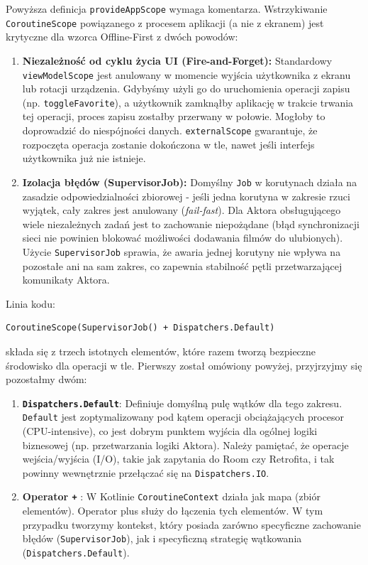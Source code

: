 Powyższa definicja \texttt{provideAppScope} wymaga komentarza. Wstrzykiwanie \texttt{CoroutineScope} powiązanego z procesem aplikacji (a nie z ekranem) jest krytyczne dla wzorca Offline-First z dwóch powodów: 
\begin{enumerate}
    \item \textbf{Niezależność od cyklu życia UI (Fire-and-Forget):}
    Standardowy \texttt{viewModelScope} jest anulowany w momencie wyjścia użytkownika z ekranu lub rotacji urządzenia. Gdybyśmy użyli go do uruchomienia operacji zapisu (np. \texttt{toggleFavorite}), a użytkownik zamknąłby aplikację w trakcie trwania tej operacji, proces zapisu zostałby przerwany w połowie. Mogłoby to doprowadzić do niespójności danych. \texttt{externalScope} gwarantuje, że rozpoczęta operacja zostanie dokończona w tle, nawet jeśli interfejs użytkownika już nie istnieje.

    \item \textbf{Izolacja błędów (SupervisorJob):}
    Domyślny \texttt{Job} w korutynach działa na zasadzie odpowiedzialności zbiorowej - jeśli jedna korutyna w zakresie rzuci wyjątek, cały zakres jest anulowany (\textit{fail-fast}). Dla Aktora obsługującego wiele niezależnych zadań jest to zachowanie niepożądane (błąd synchronizacji sieci nie powinien blokować możliwości dodawania filmów do ulubionych). Użycie \texttt{SupervisorJob} sprawia, że awaria jednej korutyny nie wpływa na pozostałe ani na sam zakres, co zapewnia stabilność pętli przetwarzającej komunikaty Aktora.
\end{enumerate}

Linia kodu:
\begin{verbatim}
CoroutineScope(SupervisorJob() + Dispatchers.Default)
\end{verbatim}
składa się z trzech istotnych elementów, które razem tworzą bezpieczne środowisko dla operacji w tle. Pierwszy został omówiony powyżej, przyjrzyjmy się pozostałmy dwóm:

\begin{enumerate}
    
    \item \textbf{\texttt{Dispatchers.Default}}: 
    Definiuje domyślną pulę wątków dla tego zakresu. \texttt{Default} jest zoptymalizowany pod kątem operacji obciążających procesor (CPU-intensive), co jest dobrym punktem wyjścia dla ogólnej logiki biznesowej (np. przetwarzania logiki Aktora). Należy pamiętać, że operacje wejścia/wyjścia (I/O), takie jak zapytania do Room czy Retrofita, i tak powinny wewnętrznie przełączać się na \texttt{Dispatchers.IO}.
    
    \item \textbf{Operator \texttt{+}} : 
    W Kotlinie \texttt{CoroutineContext} działa jak mapa (zbiór elementów). Operator plus służy do łączenia tych elementów. W tym przypadku tworzymy kontekst, który posiada zarówno specyficzne zachowanie błędów (\texttt{SupervisorJob}), jak i specyficzną strategię wątkowania (\texttt{Dispatchers.Default}).
\end{enumerate}

